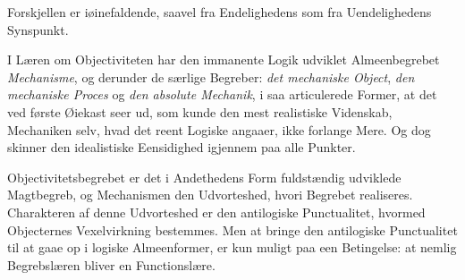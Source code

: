 \documentclass[12pt]{book}
\begin{document}
Forskjellen er iøinefaldende, saavel fra Endelighedens som fra
Uendelighedens Synspunkt.

I Læren om Objectiviteten har den immanente Logik udviklet
Almeenbegrebet \emph{Mechanisme}, og derunder de særlige Begreber:
\emph{det mechaniske Object}, \emph{den mechaniske Proces} og
\emph{den absolute Mechanik}, i saa articulerede Former, at det ved
første Øiekast seer ud, som kunde den mest realistiske Videnskab,
Mechaniken selv, hvad det reent Logiske angaaer, ikke forlange Mere.
Og dog skinner den idealistiske Eensidighed igjennem paa alle
Punkter.

Objectivitetsbegrebet er det i Andethedens Form fuldstændig
udviklede Magtbegreb, og Mechanismen den Udvorteshed, hvori Begrebet
realiseres. Charakteren af denne Udvorteshed er den antilogiske
Punctualitet, hvormed Objecternes Vexelvirkning bestemmes. Men at
bringe den antilogiske Punctualitet til at gaae op i logiske
Almeenformer, er kun muligt paa een Betingelse: at nemlig
Begrebslæren bliver en Functionslære.
\end{document}
